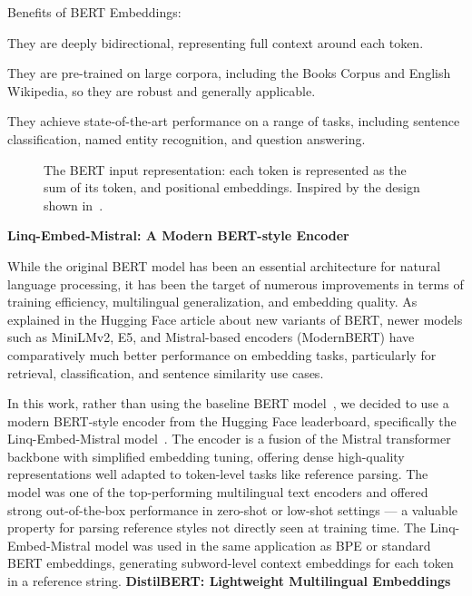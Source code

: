 Benefits of BERT Embeddings:
\begin{compactitem}
\item They are deeply bidirectional, representing full context around each token.
\item They are pre-trained on large corpora, including the Books Corpus and English Wikipedia, so they are robust and generally applicable.
\item They achieve state-of-the-art performance on a range of tasks, including sentence classification, named entity recognition, and question answering.
\end{compactitem}

\begin{figure}[ht]
    \centering
    
    \caption[BERT Input Representation]{The BERT input representation: each token is represented as the sum of its token, and positional embeddings. Inspired by the design shown in~\cite{2019-bert}.}
    \label{fig:bert-input}
\end{figure}

\textbf{Linq-Embed-Mistral: A Modern BERT-style Encoder}

While the original BERT model has been an essential architecture for natural language processing, it has been the target of numerous improvements in terms of training efficiency, multilingual generalization, and embedding quality. As explained in the Hugging Face article about new variants of BERT, newer models such as MiniLMv2, E5, and Mistral-based encoders (ModernBERT) have comparatively much better performance on embedding tasks, particularly for retrieval, classification, and sentence similarity use cases.

In this work, rather than using the baseline BERT model~\cite{2019-bert}, we decided to use a modern BERT-style encoder from the Hugging Face leaderboard, specifically the Linq-Embed-Mistral model~\cite{linq}. The encoder is a fusion of the Mistral transformer backbone with simplified embedding tuning, offering dense high-quality representations well adapted to token-level tasks like reference parsing. The model was one of the top-performing multilingual text encoders and offered strong out-of-the-box performance in zero-shot or low-shot settings — a valuable property for parsing reference styles not directly seen at training time.
The Linq-Embed-Mistral model was used in the same application as BPE or standard BERT embeddings, generating subword-level context embeddings for each token in a reference string.
\newline
\newline
\textbf{DistilBERT: Lightweight Multilingual Embeddings}

